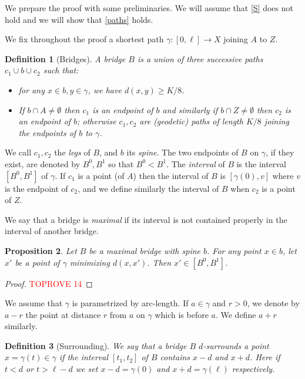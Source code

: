 \documentclass[a4paper]{article}
\newcommand{\defi}[1]{{\color{darkgray}\emph{#1}}}
\newtheorem{proposition}{Proposition}[section]
\newtheorem{definition}[proposition]{Definition}
\begin{document}
We prepare the proof with some preliminaries. 
We will assume that \ref{S} does not hold and we will show that \ref{paths} holds.


We fix throughout the proof a shortest path $\gamma :[0,\ell]\to X $ joining $A$ to $Z$.
 
\begin{definition}[Bridges] \label{bridge}
A \textit{bridge} $B$ is a union of three successive paths $c_1\cup b\cup c_2$ 
such that:

\begin{itemize}
\item for any $x\in b, y\in \gamma $, we have  $d(x,y)\geq K/8$.

\item If $b\cap A\ne \emptyset $ then $c_1$ is an endpoint of $b$ and similarly if
$b\cap Z\ne \emptyset $ then $c_2$ is an endpoint of $b$; otherwise
$c_1,c_2$ are (geodetic) paths of length $K/8$ joining the endpoints
of $b$ to $\gamma $. 

\end{itemize}

\end{definition}

We call $c_1,c_2$ the \defi{legs} of $B$, and $b$ its \defi{spine}. The two endpoints of $B$ on $\gamma$, if they exist, are denoted by $B^0,B^1$ so that $B^0< B^1$. The \defi{interval} of $B$ is the interval $[B^0,B^1]$ of $\gamma$. If $c_1$ is a point (of $A$) then the interval of $B$ is $[\gamma (0),v]$ where $v$ is the
endpoint of $c_2$, and we define similarly the interval of $B$ when $c_2$ is a point of $Z$.

We say that a bridge is \textit{maximal} if its interval is not contained properly in the interval of another bridge.	
 
\begin{proposition} \label{max}
Let $B$ be a maximal bridge with spine $b$. For any point $x\in b$, let $x'$ be a point of $\gamma$ minimizing $d(x,x')$. Then $x'\in [B^0,B^1]$.
\end{proposition}
\begin{proof}\textcolor{red}{TOPROVE 14}\end{proof}

We assume that $\gamma $ is parametrized by arc-length. If $a\in \gamma $ and $r>0$, we denote by 
$a-r$  the point at distance $r$ from $a$ on $\gamma $ which is before $a$. We define $a+r$ similarly.

\begin{definition}[Surrounding] \label{surround}
We say that a bridge $B$ $d$-\textit{surrounds} a point $x=\gamma (t)\in \gamma $ if the interval $[t_1,t_2]$ of $B$
contains $x-d$ and $x+d$. Here if $t<d$ or $t>\ell -d$ we set $x-d=\gamma (0)$ and $x+d=\gamma (\ell)$ respectively.
\end{definition}
\end{document}
